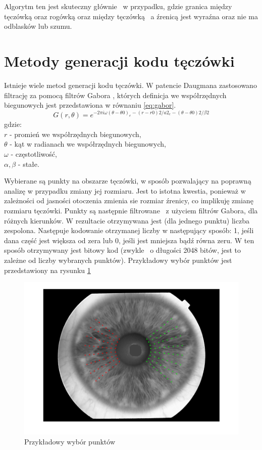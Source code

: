 Algorytm ten jest skuteczny głównie ~w przypadku, gdzie granica między tęczówką oraz rogówką oraz między tęczówką ~a źrenicą jest wyraźna oraz nie ma odblasków lub szumu.

\section{Metody generacji kodu tęczówki}
\label{sec:metodyGeneracjiKodu}

Istnieje wiele metod generacji kodu tęczówki. W patencie Daugmana zastosowano filtrację za pomocą filtrów Gabora \cite{Daugman}, których definicja we współrzędnych biegunowych jest przedstawiona w równaniu \ref{eq:gabor}.
\begin{equation}
\label{eq:gabor}
G(r,\theta) = e^{-2\pi i\omega (\theta - \theta 0)_{e}-(r - r0)2/a2_{e}-(\theta-\theta 0 )2/\beta 2}
\end{equation}
gdzie:\\
$r$ - promień we współrzędnych biegunowych, \\
$\theta$ - kąt w radianach we współrzędnych biegunowych, \\
$ \omega $ - częstotliwość, \\
$ \alpha, \beta $ - stałe.


Wybierane są punkty na obszarze tęczówki, w sposób pozwalający na poprawną analizę w przypadku zmiany jej rozmiaru. Jest to istotna kwestia, ponieważ w zależności od jasności otoczenia zmienia sie rozmiar źrenicy, co implikuję zmianę rozmiaru tęczówki. Punkty są następnie filtrowane ~z użyciem filtrów Gabora, dla różnych kierunków. W rezultacie otrzymywana jest (dla jednego punktu) liczba zespolona. Następuje kodowanie otrzymanej liczby w następujący sposób: 1, jeśli dana część jest większa od zera lub 0, jeśli jest mniejsza bądź równa zeru. W ten sposób otrzymywany jest bitowy kod (zwykle ~o długości 2048 bitów, jest to zależne od liczby wybranych punktów). Przykładowy wybór punktów jest przedstawiony na rysunku \ref{fig:przykladPunkty}

\begin{figure}
\begin{center}
\includegraphics[scale=0.5]{punkty.png}
\caption{Przykładowy wybór punktów}
\label{fig:przykladPunkty}
\end{center}
\end{figure}

